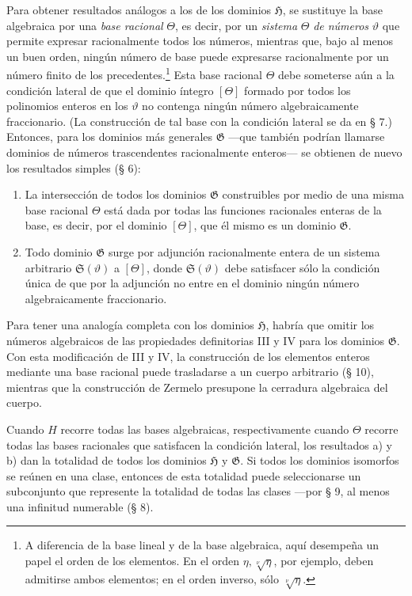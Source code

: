 Para obtener resultados análogos a los de los dominios $\mathfrak H$, se sustituye la base algebraica por una \emph{base racional} $\Theta$, es decir, por un \emph{sistema} $\Theta$ \emph{de números} $\vartheta$ que permite expresar racionalmente todos los números, mientras que, bajo al menos un buen orden, ningún número de base puede expresarse racionalmente por un número finito de los precedentes.\footnote{A diferencia de la base lineal y de la base algebraica, aquí desempeña un papel el orden de los elementos. En el orden $\eta,\sqrt[\nu]{\eta}$, por ejemplo, deben admitirse ambos elementos; en el orden inverso, sólo $\sqrt[\nu]{\eta}$.} Esta base racional $\Theta$ debe someterse aún a la condición lateral de que el dominio íntegro $[\Theta]$ formado por todos los polinomios enteros en los $\vartheta$ no contenga ningún número algebraicamente fraccionario. (La construcción de tal base con la condición lateral se da en § 7.) Entonces, para los dominios más generales $\mathfrak G$ ---que también podrían llamarse dominios de números trascendentes racionalmente enteros--- se obtienen de nuevo los resultados simples (§ 6):
\begin{enumerate}
\item[a)] La intersección de todos los dominios $\mathfrak G$ construibles por medio de una misma base racional $\Theta$ está dada por todas las funciones racionales enteras de la base, es decir, por el dominio $[\Theta]$, que él mismo es un dominio $\mathfrak G$.
\item[b)] Todo dominio $\mathfrak G$ surge por adjunción racionalmente entera de un sistema arbitrario $\mathfrak S(\vartheta)$ a $[\Theta]$, donde $\mathfrak S(\vartheta)$ debe satisfacer sólo la condición única de que por la adjunción no entre en el dominio ningún número algebraicamente fraccionario.
\end{enumerate}

Para tener una analogía completa con los dominios $\mathfrak H$, habría que omitir los números algebraicos de las propiedades definitorias III y IV para los dominios $\mathfrak G$. Con esta modificación de III y IV, la construcción de los elementos enteros mediante una base racional puede trasladarse a un cuerpo arbitrario (§ 10), mientras que la construcción de Zermelo presupone la cerradura algebraica del cuerpo.

Cuando $H$ recorre todas las bases algebraicas, respectivamente cuando $\Theta$ recorre todas las bases racionales que satisfacen la condición lateral, los resultados a) y b) dan la totalidad de todos los dominios $\mathfrak H$ y $\mathfrak G$. Si todos los dominios isomorfos se reúnen en una clase, entonces de esta totalidad puede seleccionarse un subconjunto que represente la totalidad de todas las clases ---por § 9, al menos una infinitud numerable (§ 8).

